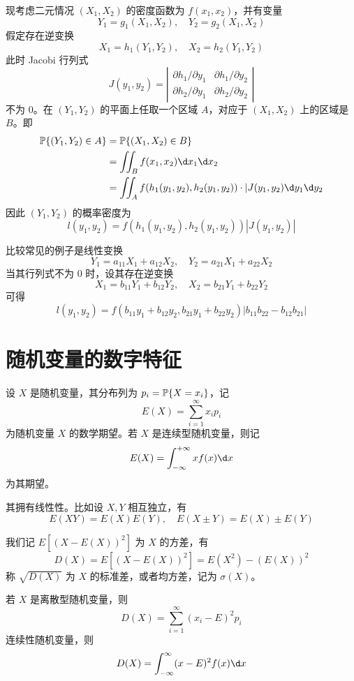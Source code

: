现考虑二元情况 $(X_1, X_2)$ 的密度函数为 $f(x_1, x_2)$，并有变量
\[ Y_1 = g_1(X_1, X_2), \quad Y_2 = g_2(X_1, X_2) \]
假定存在逆变换
\[ X_1 = h_1(Y_1, Y_2), \quad X_2 = h_2(Y_1, Y_2) \]
此时 Jacobi 行列式
\[ J(y_1, y_2) = \left|\begin{matrix}
		\partial h_1 / \partial y_1 & \partial h_1 / \partial y_2 \\
		\partial h_2 / \partial y_1 & \partial h_2 / \partial y_2
	\end{matrix}\right| \]
不为 $0$。在 $(Y_1, Y_2)$ 的平面上任取一个区域 $A$，对应于 $(X_1, X_2)$ 上的区域是 $B$。即
\[ \begin{aligned}
		\bbP\{(Y_1, Y_2) \in A\} & = \bbP\{(X_1, X_2) \in B\}                                                      \\
		                      & = \iint_{B} f(x_1, x_2) \d x_1 \d x_2                                        \\
		                      & = \iint_{A} f(h_1(y_1, y_2), h_2(y_1, y_2)) \cdot |J(y_1, y_2) \d y_1 \d y_2
	\end{aligned} \]
因此 $(Y_1, Y_2)$ 的概率密度为
\[ l(y_1, y_2) = f(h_1(y_1, y_2), h_2(y_1, y_2)) | J(y_1, y_2)| \]

比较常见的例子是线性变换
\[ Y_1 = a_{11} X_1 + a_{12} X_2, \quad Y_2 = a_{21} X_1 + a_{22} X_2 \]
当其行列式不为 $0$ 时，设其存在逆变换
\[ X_1 = b_{11} Y_1 + b_{12} Y_2, \quad X_2 = b_{21} Y_1 + b_{22} Y_2 \]
可得
\[ l(y_1, y_2) = f(b_{11} y_1 + b_{12} y_2, b_{21} y_1 + b_{22} y_2) | b_{11} b_{22} - b_{12} b_{21} | \]

\section{随机变量的数字特征}

设 $X$ 是随机变量，其分布列为 $p_i = \mathbb{P}\{X = x_i\}$，记
\[ E(X) = \sum_{i=1}^\infty x_i p_i \]
为随机变量 $X$ 的数学期望。若 $X$ 是连续型随机变量，则记
\[ E(X) = \int_{-\infty}^{+\infty} x f(x) \d x \]
为其期望。

其拥有线性性。比如设 $X, Y$ 相互独立，有
\[ E(X Y) = E(X) E(Y), \quad E(X \pm Y) = E(X) \pm E(Y) \]

我们记 $E[(X - E(X))^2]$ 为 $X$ 的方差，有
\[ D(X) = E[(X - E(X))^2] = E(X^2) - (E(X))^2 \]
称 $\sqrt{D(X)}$ 为 $X$ 的标准差，或者均方差，记为 $\sigma(X)$。

若 $X$ 是离散型随机变量，则
\[ D(X) = \sum_{i=1}^{\infty} (x_i - E)^2 p_i \]
连续性随机变量，则
\[ D(X) = \int_{-\infty}^{\infty} (x-E)^2 f(x) \d x \]

